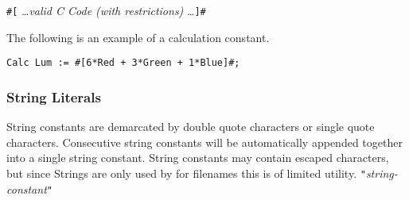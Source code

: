 \startsyn
\texttt{\#[} \ldots \emph{valid C Code (with restrictions)} \ldots\texttt{]\#} \\
\stopsyn

The following is an example of a calculation constant.
\begin{lstlisting}[language=CLAM,escapechar=\%]
Calc Lum := #[6*Red + 3*Green + 1*Blue]#;
\end{lstlisting}

\subsubsection{String Literals}
\label{sssec:strings}

String constants are demarcated by double quote characters or single
quote characters. Consecutive string constants will be automatically
appended together into a single string constant.
String constants may contain escaped characters, but since Strings
are only used by for filenames this is of limited utility.
\startsyn
\texttt{"}\emph{string-constant}\texttt{"}
\stopsyn

